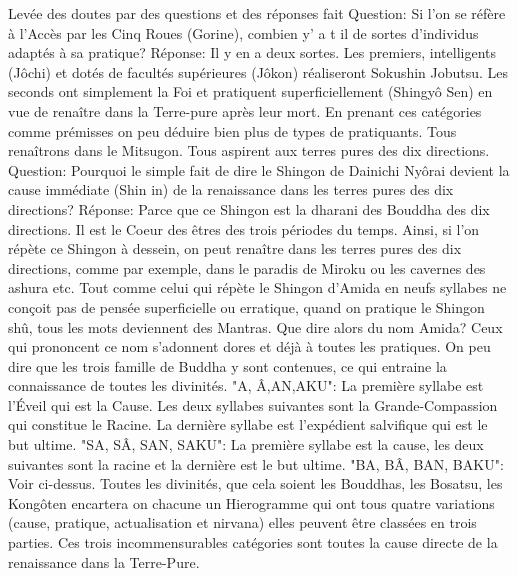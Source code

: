Levée des doutes par des questions et des réponses fait
Question: 
Si l'on se réfère à l’Accès par les Cinq Roues (Gorine), combien y' a t il de sortes d'individus adaptés à sa pratique?
Réponse: 
Il y en a deux sortes. Les premiers, intelligents (Jôchi) et dotés de facultés supérieures (Jôkon) réaliseront Sokushin Jobutsu. Les seconds ont simplement la Foi et pratiquent superficiellement (Shingyô Sen) en vue de renaître dans la Terre-pure après leur mort. En prenant ces catégories comme prémisses on peu déduire bien plus de types de pratiquants. Tous renaîtrons dans le Mitsugon. Tous aspirent aux terres pures des dix directions.
Question:
Pourquoi le simple fait de dire le Shingon de Dainichi Nyôrai devient la cause immédiate (Shin in) de la renaissance dans les terres pures des dix directions?
Réponse:
Parce que  ce Shingon est la dharani des Bouddha des dix directions. Il est le Coeur des êtres des trois périodes du temps. Ainsi, si l'on répète ce Shingon à dessein, on peut renaître dans les terres pures des dix directions, comme par exemple, dans le paradis de Miroku ou les cavernes des ashura etc. Tout comme celui qui répète le Shingon d'Amida en neufs syllabes ne conçoit pas de pensée superficielle ou erratique, quand on pratique le Shingon shû, tous les mots deviennent des Mantras. Que dire alors du nom Amida? Ceux qui prononcent ce nom s'adonnent dores et déjà à toutes les pratiques. On peu dire que les trois famille de Buddha y sont contenues, ce qui entraine la connaissance de toutes les divinités.
"A, Â,AN,AKU": La première syllabe est l’Éveil qui est la Cause. Les deux syllabes suivantes sont la Grande-Compassion qui constitue le Racine. La dernière syllabe est l'expédient salvifique qui est le but ultime.
"SA, SÂ, SAN, SAKU": La première syllabe est la cause, les deux suivantes sont la racine et la dernière est le but ultime.
"BA, BÂ, BAN, BAKU": Voir ci-dessus.
Toutes les divinités, que cela soient les Bouddhas, les Bosatsu, les Kongôten encartera on chacune un Hierogramme qui ont tous quatre variations (cause, pratique, actualisation et nirvana) elles peuvent être classées en trois parties. Ces trois incommensurables catégories sont toutes la cause directe de la renaissance dans la Terre-Pure.

